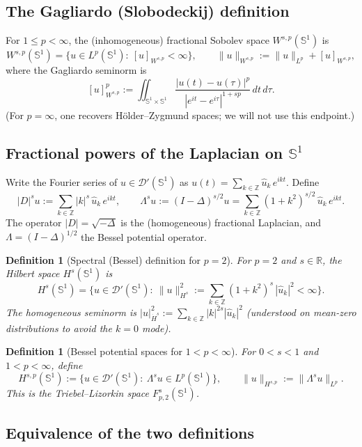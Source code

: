 \documentclass{amsart}
\newcounter{thm}
\newcounter{re}
\newtheorem{definition}[thm]{Definition}
\begin{document}
\subsection{The Gagliardo (Slobodeckij) definition}

For $1\le p<\infty$, the (inhomogeneous) fractional Sobolev space
$W^{s,p}(\mathbb S^1)$ is
\[
W^{s,p}(\mathbb S^1)
=\Big\{u\in L^p(\mathbb S^1):\ [u]_{W^{s,p}}<\infty\Big\},\qquad
\|u\|_{W^{s,p}}:=\|u\|_{L^p}+ [u]_{W^{s,p}},
\]
where the Gagliardo seminorm is
\[
[u]_{W^{s,p}}^p
:=\iint_{\mathbb S^1\times\mathbb S^1}
\frac{|u(t)-u(\tau)|^p}{|e^{it}-e^{i\tau}|^{1+sp}}\,dt\,d\tau.
\]
(For $p=\infty$, one recovers Hölder--Zygmund spaces; we will not use this endpoint.)

\subsection{Fractional powers of the Laplacian on $\mathbb S^1$}

Write the Fourier series of $u\in\mathcal D'(\mathbb S^1)$ as
\(
u(t)=\sum_{k\in\mathbb Z}\widehat u_k\,e^{ikt}.
\)
Define
\[
|D|^s u := \sum_{k\in\mathbb Z} |k|^s\,\widehat u_k\,e^{ikt},\qquad
\Lambda^s u := (I-\Delta)^{s/2}u
=\sum_{k\in\mathbb Z} (1+k^2)^{s/2}\,\widehat u_k\,e^{ikt}.
\]
The operator $|D|=\sqrt{-\Delta}$ is the (homogeneous) fractional Laplacian,
and $\Lambda=(I-\Delta)^{1/2}$ the Bessel potential operator.

\begin{definition}[Spectral (Bessel) definition for $p=2$]
For $p=2$ and $s\in\mathbb R$, the Hilbert space $H^s(\mathbb S^1)$ is
\[
H^s(\mathbb S^1)=\Big\{u\in\mathcal D'(\mathbb S^1):\
\|u\|_{H^s}^2:=\sum_{k\in\mathbb Z}(1+k^2)^s\,|\widehat u_k|^2<\infty\Big\}.
\]
The \emph{homogeneous} seminorm is
\(
|u|_{\dot H^s}^2 := \sum_{k\in\mathbb Z}|k|^{2s}|\widehat u_k|^2
\)
(understood on mean-zero distributions to avoid the $k=0$ mode).
\end{definition}

\begin{definition}[Bessel potential spaces for $1<p<\infty$]
For $0<s<1$ and $1<p<\infty$, define
\[
H^{s,p}(\mathbb S^1):=\big\{u\in\mathcal D'(\mathbb S^1):\ \Lambda^s u\in L^p(\mathbb S^1)\big\},
\qquad \|u\|_{H^{s,p}}:=\|\Lambda^s u\|_{L^p}.
\]
This is the Triebel--Lizorkin space $F^s_{p,2}(\mathbb S^1)$.
\end{definition}

\subsection{Equivalence of the two definitions}
\end{document}
